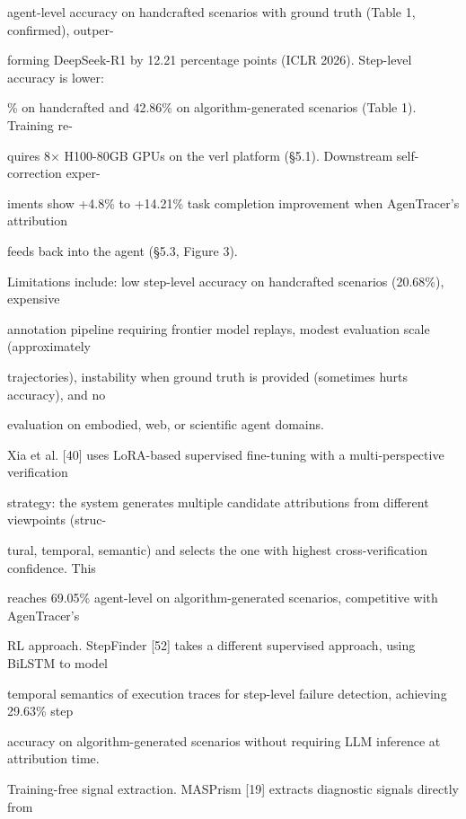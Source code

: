 \begin{flushleft}
\noindent agent-level accuracy on handcrafted scenarios with ground truth (Table 1, confirmed), outper-\par
\noindent forming DeepSeek-R1 by 12.21 percentage points (ICLR 2026). Step-level accuracy is lower:\par
{}\% on handcrafted and 42.86\% on algorithm-generated scenarios (Table 1). Training re-\par
\noindent quires 8× H100-80GB GPUs on the verl platform (§5.1). Downstream self-correction exper-\par
\noindent iments show +4.8\% to +14.21\% task completion improvement when AgenTracer’s attribution\par
\noindent feeds back into the agent (§5.3, Figure 3).\par
\noindent  Limitations include: low step-level accuracy on handcrafted scenarios (20.68\%), expensive\par
\noindent annotation pipeline requiring frontier model replays, modest evaluation scale (approximately\par
{} trajectories), instability when ground truth is provided (sometimes hurts accuracy), and no\par
\noindent evaluation on embodied, web, or scientific agent domains.\par
\noindent  Xia et al. [40] uses LoRA-based supervised fine-tuning with a multi-perspective verification\par
\noindent strategy: the system generates multiple candidate attributions from different viewpoints (struc-\par
\noindent tural, temporal, semantic) and selects the one with highest cross-verification confidence. This\par
\noindent reaches 69.05\% agent-level on algorithm-generated scenarios, competitive with AgenTracer’s\par
\noindent RL approach. StepFinder [52] takes a different supervised approach, using BiLSTM to model\par
\noindent temporal semantics of execution traces for step-level failure detection, achieving 29.63\% step\par
\noindent accuracy on algorithm-generated scenarios without requiring LLM inference at attribution time.\par
\par\smallskip
\noindent Training-free signal extraction. MASPrism [19] extracts diagnostic signals directly from\par

\end{flushleft}
